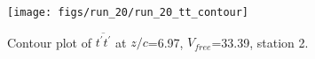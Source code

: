 \begin{figure}[H]
\centering
\texttt{[image: figs/run\_20/run\_20\_tt\_contour]}
\caption{Contour plot of $\overline{t^\prime t^\prime}$ at $z/c$=6.97, $V_{free}$=33.39, station 2.}
\label{fig:run_20_tt_contour}
\end{figure}


